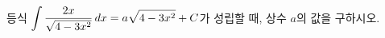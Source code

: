 등식 $\displaystyle\int\dfrac{2x}{\sqrt{4-3x^2}}\mkern3mu dx=a\sqrt{4-3x^2}+C$가 성립할 때, 상수 $a$의 값을 구하시오. 
